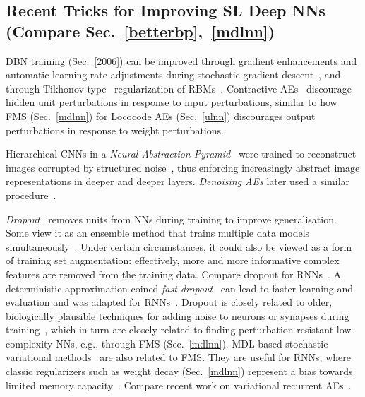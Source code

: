 \documentclass[letterpaper]{article}
\begin{document}
\begin{CJK*}{UTF8}{gbsn}
\subsection{Recent Tricks for Improving SL Deep NNs (Compare Sec.~\ref{betterbp},~\ref{mdlnn})}
\label{tricks}

DBN training (Sec.~\ref{2006}) can be improved through gradient enhancements and
automatic  learning rate adjustments during stochastic gradient descent~\citep{cho2013,cho2014}, and through 
Tikhonov-type~\citep{tikhonov1977} regularization of RBMs~\citep{cho2012}.
Contractive AEs~\citep{vincent2011} 
discourage hidden unit perturbations in response to input perturbations, 
similar to how FMS (Sec.~\ref{mdlnn}) for {\sc Lococode} AEs (Sec.~\ref{ulnn}) 
discourages output perturbations in response to weight perturbations.

Hierarchical CNNs in a {\em Neural Abstraction Pyramid}~\citep[e.g.,][]{Behnke:LNCS,Behnke:NCA}
were trained to 
 reconstruct images corrupted by structured noise~\citep{Behnke:IJCIA2001},
thus enforcing increasingly abstract image representations in 
deeper and deeper layers.
{\em Denoising AEs} later used a similar procedure~\citep{vincent:2008}.


{\em Dropout}~\citep{Hinton2012,frey2013}  removes units from NNs during training to improve generalisation. Some view it as an ensemble method that trains multiple data models simultaneously~\citep{baldidropout2014}. 
Under certain circumstances, 
it could also be viewed as a form of training set augmentation: 
effectively, more and more informative complex features are removed from the training data. 
Compare dropout for RNNs~\citep{Pham2013,pachitariu2013regularization,pascanu2013construct}. 
A deterministic approximation coined {\em fast dropout}~\citep{wang2013fast} can lead to faster learning and evaluation and was adapted for RNNs~\citep{bayer2013fast}.
Dropout is closely related to older, biologically plausible techniques 
for adding noise to neurons 
or synapses during training~\citep[e.g.,][]{hanson1990,Murray:93,Schuster:92,Nadal:94,giles95,an96},
which in turn are closely related to finding perturbation-resistant low-complexity NNs,
e.g., through FMS (Sec.~\ref{mdlnn}).
MDL-based stochastic variational methods~\citep{Graves2011} 
are also related to FMS.
They are useful for RNNs, where classic regularizers such as  weight decay
(Sec.~\ref{mdlnn}) represent a 
bias towards limited memory capacity~\citep[e.g.,][]{pascanu2013}. 
Compare recent work on variational recurrent AEs~\citep{bayer2014variational}.


\end{CJK*}
\end{document}
